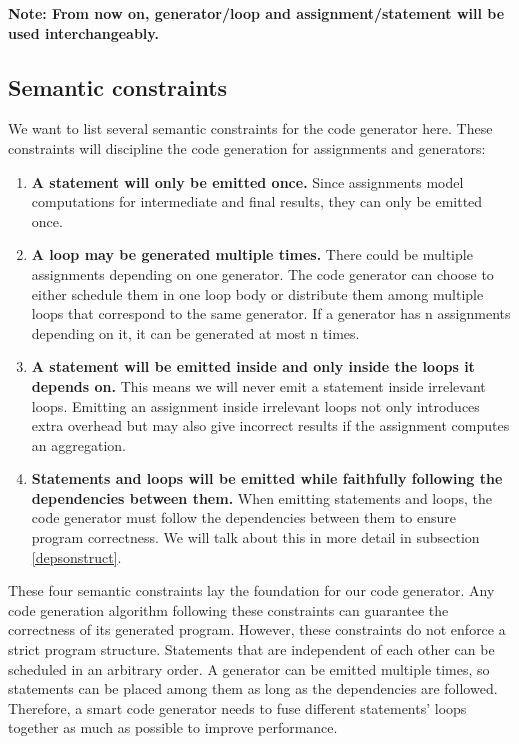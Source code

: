\documentclass[sigplan, nonacm]{acmart}\settopmatter{printfolios=true,printccs=false,printacmref=false}
\begin{document}
\textbf{Note: From now on, generator/loop and assignment/statement will be used interchangeably.}

\subsection[]{Semantic constraints}\label{semconst}

We want to list several semantic constraints for the code generator here. These constraints will discipline the code generation for assignments and generators:

\begin{enumerate}
\item \textbf{A statement will only be emitted once.} Since assignments model computations for intermediate and final results, they can only be emitted once.
\item \textbf{A loop may be generated multiple times.} There could be multiple assignments depending on one generator. The code generator can choose to either schedule them in one loop body or distribute them among multiple loops that correspond to the same generator. If a generator has n assignments depending on it, it can be generated at most n times.
\item \textbf{A statement will be emitted inside and only inside the loops it depends on.} This means we will never emit a statement inside irrelevant loops. Emitting an assignment inside irrelevant loops not only introduces extra overhead but may also give incorrect results if the assignment computes an aggregation.
\item \textbf{Statements and loops will be emitted while faithfully following the dependencies between them.} When emitting statements and loops, the code generator must follow the dependencies between them to ensure program correctness. We will talk about this in more detail in subsection \ref{depsonstruct}.
\end{enumerate}

These four semantic constraints lay the foundation for our code generator. Any code generation algorithm following these constraints can guarantee the correctness of its generated program. However, these constraints do not enforce a strict program structure. Statements that are independent of each other can be scheduled in an arbitrary order. A generator can be emitted multiple times, so statements can be placed among them as long as the dependencies are followed. Therefore, a smart code generator needs to fuse different statements' loops together as much as possible to improve performance.
\end{document}
